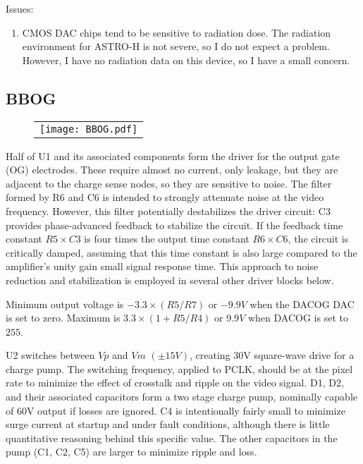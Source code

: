 \documentclass[a4paper,12pt]{article}
\begin{document}
Issues:
\begin{enumerate}
\item
CMOS DAC chips tend to be sensitive to radiation dose. The radiation environment for ASTRO-H is not severe, so I do not expect a problem. However, I have no radiation data on this device, so I have a small concern.
\end{enumerate}

\subsection{BBOG}

   \begin{figure}
   \begin{center}
   \begin{tabular}{c}
   \texttt{[image: BBOG.pdf]}
   \end{tabular}
   \end{center}
   \end{figure}
Half of U1 and its associated components form the driver for the output gate (OG) electrodes. These require almost no current, only leakage, but they are adjacent to the charge sense nodes, so they are sensitive to noise. The filter formed by R6 and C6 is intended to strongly attenuate noise at the video frequency. However, this filter potentially destabilizes the driver circuit: C3 provides phase-advanced feedback to stabilize the circuit. If the feedback time constant $R5\times C3$ is four times the output time constant $R6\times C6$, the circuit is critically damped, assuming that this time constant is also large compared to the amplifier's unity gain small signal response time. This approach to noise reduction and stabilization is employed in several other driver blocks below.

Minimum output voltage is $-3.3\times(R5/R7)$ or $-9.9V$ when the DACOG DAC is set to zero. Maximum is $3.3\times(1+R5/R4)$ or $9.9V$ when DACOG is set to $255$.

U2 switches between $Vp$ and $Vm$ $(\pm15V)$, creating 30V square-wave drive for a charge pump. The switching frequency, applied to PCLK, should be at the pixel rate to minimize the effect of crosstalk and ripple on the video signal. D1, D2, and their associated capacitors form a two stage charge pump, nominally capable of 60V output if losses are ignored. C4 is intentionally fairly small to minimize surge current at startup and under fault conditions, although there is little quantitative reasoning behind this specific value. The other capacitors in the pump (C1, C2, C5) are larger to minimize ripple and loss.
\end{document}
